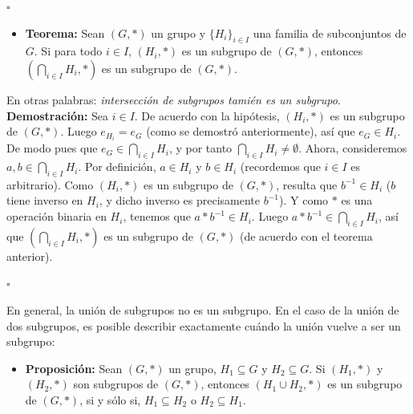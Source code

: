 \documentclass[10 pt]{article}
\begin{document}
\begin{flushright}
    $\square$
\end{flushright}

\begin{itemize}
    \item \Large{\textbf{Teorema:} Sean $(G,*)$ un grupo y $\{H_i\}_{i \in I}$ una familia de subconjuntos de $G$. Si para todo $i \in I$, $(H_i,*)$ es un subgrupo de $(G,*)$, entonces $(\bigcap_{i\in I}H_i,*)$ es un subgrupo de $(G,*)$.} \\
\end{itemize}

\Large{En otras palabras: \textit{intersección de subgrupos tamién es un subgrupo}.} \\

\Large{\textbf{Demostración:} Sea $i \in I$. De acuerdo con la hipótesis, $(H_i,*)$ es un subgrupo de $(G,*)$. Luego $e_{H_i}=e_G$ (como se demostró anteriormente), así que $e_G \in H_i$. De modo pues que $e_G \in \bigcap_{i \in I}H_i$, y por tanto $\bigcap_{i \in I}H_i \neq \emptyset$. Ahora, consideremos $a,b \in \bigcap_{i \in I}H_i$. Por definición, $a \in H_i$ y $b \in H_i$ (recordemos que $i \in I$ es arbitrario). Como $(H_i,*)$ es un subgrupo de $(G,*)$, resulta que $b^{-1} \in H_i$ ($b$ tiene inverso en $H_i$, y dicho inverso es precisamente $b^{-1}$). Y como $*$ es una operación binaria en $H_i$, tenemos que $a*b^{-1} \in H_i$. Luego $a*b^{-1} \in \bigcap_{i \in I}H_i$, así que $(\bigcap_{i \in I} H_{i},*)$ es un subgrupo de $(G,*)$ (de acuerdo con el teorema anterior).} \\

\begin{flushright}
    $\square$
\end{flushright}

\Large{En general, la unión de subgrupos no es un subgrupo. En el caso de la unión de dos subgrupos, es posible describir exactamente cuándo la unión vuelve a ser un subgrupo:} \\

\begin{itemize}
    \item \Large{\textbf{Proposición:} Sean $(G,*)$ un grupo, $H_1 \subseteq G$ y $H_2 \subseteq G$. Si $(H_1,*)$ y $(H_2,*)$ son subgrupos de $(G,*)$, entonces $(H_1 \cup H_2,*)$ es un subgrupo de $(G,*)$, si y sólo si, $H_1 \subseteq H_2$ o $H_2 \subseteq H_1$.} \\
\end{itemize}
\end{document}
